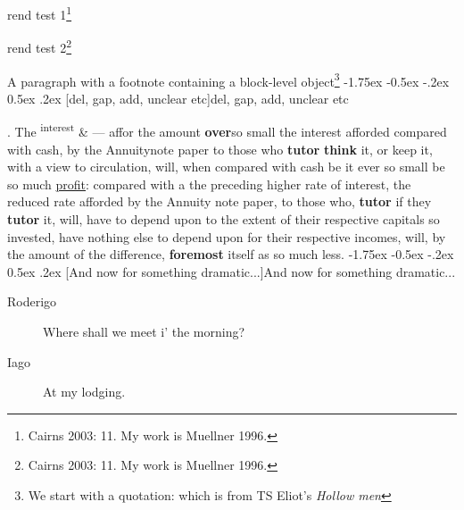 \documentclass[11pt,twoside]{article}\makeatletter
\makeatletter
\renewcommand\section{\@startsection {section}{1}{\z@}%
     {-1.75ex \@plus -0.5ex \@minus -.2ex}%
     {0.5ex \@plus .2ex}%
     {\reset@font\Large\bfseries\sffamily}}
\renewcommand\subsection{\@startsection{subsection}{2}{\z@}%
     {-1.75ex\@plus -0.5ex \@minus- .2ex}%
     {0.5ex \@plus .2ex}%
     {\reset@font\Large\sffamily}}
\def\DivII{\subsection}
\def\DivII{\section}
\makeatother
\begin{document}
 \par
{rend test 1}\footnote{Cairns 2003: 11. My work is Muellner 1996.}\par
{rend test 2}\footnote{Cairns 2003: 11. My work is Muellner 1996.}\par
A paragraph with a footnote containing a block-level 	object\footnote{We start with a quotation: which is from TS Eliot's \textit{Hollow men} } 
\DivII[del, gap, add, unclear etc]{del, gap, add, unclear etc}\par
. The \textsuperscript{interest} & — affor  	the amount \textbf{over}{\hskip1pt}\newline  so small the interest afforded 	compared with cash,  by the Annuity{\hskip1pt}\newline  note 	paper to those who \textbf{tutor} 	\textbf{think} it, or keep it, with a view {\hskip1pt}\newline  	to circulation, will, when compared with cash 	be it ever so small be {\hskip1pt}\newline  so much \uline{profit}: compared with a 	the preceding higher {\hskip1pt}\newline  rate of interest, the reduced 	rate afforded by the Annuity {\hskip1pt}\newline  note paper, to those who, 	\textbf{tutor} if they \textbf{tutor} it, 	{\hskip1pt}\newline  will, have to depend upon to the extent of their {\hskip1pt}\newline  	respective capitals so invested, have nothing else {\hskip1pt}\newline  to depend upon for 	their respective incomes, will,  	by the {\hskip1pt}\newline  amount of the difference, \textbf{foremost} 	itself as so {\hskip1pt}\newline  much less.
\DivII[And now for something dramatic...]{And now for something dramatic...} \begin{description} \item[Roderigo] 

Where shall we meet i' the morning?\end{description}
 \begin{description} \item[Iago] 

At my lodging.\end{description}
\end{document}
